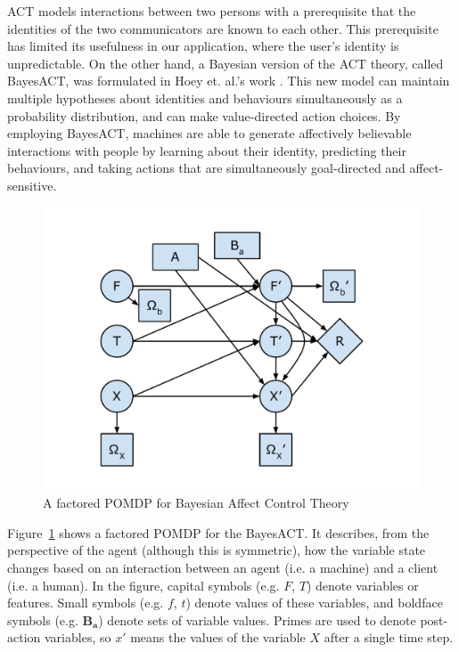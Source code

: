 ACT models interactions between two persons with a prerequisite that the identities of the two communicators are known to each other. This prerequisite has limited its usefulness in our application, where the user's identity is unpredictable. On the other hand, a Bayesian version of the ACT theory, called BayesACT, was formulated in Hoey et. al.'s work \cite{hoey2013bayesian}. This new model can maintain multiple hypotheses about identities and behaviours simultaneously as a probability distribution, and can make value-directed action choices. By employing BayesACT, machines are able to generate affectively believable interactions with people by learning about their identity, predicting their behaviours, and taking actions that are simultaneously goal-directed and affect-sensitive.

\begin{figure}[htb]
\centering
\includegraphics[width=0.9\linewidth]{fig-bayesact.pdf}
\caption{A factored POMDP for Bayesian Affect Control Theory}
\label{fig:bayesact}
\end{figure}

Figure~\ref{fig:bayesact} shows a factored POMDP for the BayesACT. It describes, from the perspective of the agent (although this is symmetric), how the variable state changes based on an interaction between an agent (i.e. a machine) and a client (i.e. a human). In the figure, capital symbols (e.g. $F$, $T$) denote variables or features. Small symbols (e.g. $f$, $t$) denote values of these variables, and boldface symbols (e.g. $\mathbf{B_{a}}$) denote sets of variable values. Primes are used to denote post-action variables, so $x'$ means the values of the variable $X$ after a single time step.

